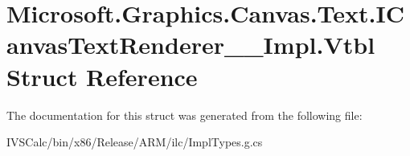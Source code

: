 \hypertarget{struct_microsoft_1_1_graphics_1_1_canvas_1_1_text_1_1_i_canvas_text_renderer_____impl_1_1_vtbl}{}\section{Microsoft.\+Graphics.\+Canvas.\+Text.\+I\+Canvas\+Text\+Renderer\+\_\+\+\_\+\+Impl.\+Vtbl Struct Reference}
\label{struct_microsoft_1_1_graphics_1_1_canvas_1_1_text_1_1_i_canvas_text_renderer_____impl_1_1_vtbl}


The documentation for this struct was generated from the following file\+:\begin{DoxyCompactItemize}
\item 
I\+V\+S\+Calc/bin/x86/\+Release/\+A\+R\+M/ilc/Impl\+Types.\+g.\+cs\end{DoxyCompactItemize}
